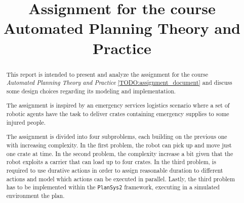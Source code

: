 \documentclass[conference]{IEEEtran}
\begin{document}
\title{Assignment for the course \\Automated Planning Theory and Practice\\
}

\author{
}

\maketitle

\begin{abstract}
This report is intended to present and analyze the assignment for the course 
\textit{Automated Planning Theory and Practice} \ref{TODO:assignment_document}
and discuss some design choices regarding its modeling and implementation.

The assignment is inspired by an emergency services logistics scenario where
a set of robotic agents have the task to deliver crates containing emergency 
supplies to some injured people.

The assignment is divided into four subproblems, each building on the previous 
one with increasing complexity.
In the first problem, the robot can pick up and move just one crate at time.
In the second problem, the complexity increase a bit given that the robot
exploits a carrier that can load up to four crates.
In the third problem, is required to use durative actions in order to assign
reasonable duration to different actions and model which actions can be executed
in parallel.
Lastly, the third problem has to be implemented within the \texttt{PlanSys2} 
framework, executing in a simulated environment the plan.



\end{abstract}
\end{document}
